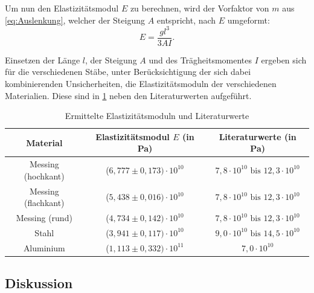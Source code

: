\documentclass[11pt,a4paper,titlepage, ngerman]{article}
\begin{document}
		Um nun den Elastizitätsmodul $E$ zu berechnen, wird der Vorfaktor von $m$ aus \cref{eq:Auslenkung}, welcher der Steigung $A$ entspricht, nach $E$ umgeformt:
		\begin{equation}
			E = \frac{gl^3}{3AI}.
		\end{equation}
		
		Einsetzen der Länge $l$, der Steigung $A$ und des Trägheitsmomentes $I$ ergeben sich für die verschiedenen Stäbe, unter Berücksichtigung der sich dabei kombinierenden Unsicherheiten, die Elastizitätsmoduln der verschiedenen Materialien. Diese sind in \cref{tab:Elastizitätsmoduln} neben den Literaturwerten aufgeführt.
		\begin{table}[ht]
			\caption{Ermittelte Elastizitätsmoduln und Literaturwerte}
			\centering
			\label{tab:Elastizitätsmoduln}
			\begin{tabular}{c|c|c}
				{Material} & {Elastizitätsmodul $E$ (in Pa)} & {Literaturwerte (in Pa)} \\
				\hline
				{Messing (hochkant)} & {($6,777\pm 0,173)\cdot 10^{10}$} & {$7,8\cdot 10^{10} \text{ bis } 12,3\cdot 10^{10}$} \\
				{Messing (flachkant)} & {($5,438\pm 0,016)\cdot 10^{10}$} & {$7,8\cdot 10^{10} \text{ bis } 12,3\cdot 10^{10}$} \\
				{Messing (rund)} & {($4,734\pm 0,142)\cdot 10^{10}$} & {$7,8\cdot 10^{10} \text{ bis } 12,3\cdot 10^{10}$} \\
				{Stahl} & {($3,941\pm 0,117)\cdot 10^{10}$} & {$9,0\cdot 10^{10} \text{ bis } 14,5\cdot 10^{10}$} \\
				{Aluminium} & {($1,113\pm 0,332)\cdot 10^{11}$} & {$7,0\cdot 10^{10}$} \\	
			\end{tabular}
		\end{table}
	
	\subsection{Diskussion}
		
\end{document}
